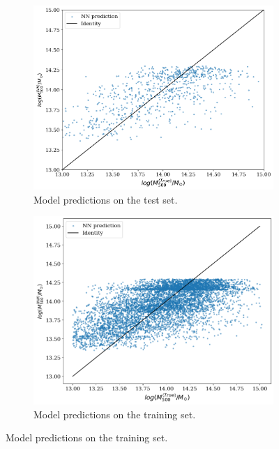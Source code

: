 \begin{figure}[H]
\centering
\begin{subfigure}{.46\textwidth}
  \centering
  \includegraphics[width=\linewidth]{images/Chapter4/VGG19/vgg19_test.png}
  \caption{Model predictions on the test set.}
  \label{fig:best_perf_vgg19_a}
\end{subfigure}%
\hspace{.6em}
\begin{subfigure}{.46\textwidth}
  \centering
  \includegraphics[width=\linewidth]{images/Chapter4/VGG19/vgg19_train.png}
  \caption{Model predictions on the training set.}
  \label{fig:best_perf_vgg19_b}
\end{subfigure}

\end{figure}

